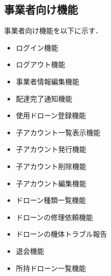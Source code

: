 \documentclass[a4paper, titlepage]{jsarticle}
\begin{document}
\subsection{事業者向け機能}
事業者向け機能を以下に示す．
\begin{itemize}[labelwidth=\linewidth]
  \setlength{\leftskip}{1em}

  \item ログイン機能  %
  \item ログアウト機能  %
  \item 事業者情報編集機能  %

  \item 配達完了通知機能  %
  \item 使用ドローン登録機能  %

  \item 子アカウント一覧表示機能 %
  \item 子アカウント発行機能 %
  \item 子アカウント削除機能 %
  \item 子アカウント編集機能 %

  \item ドローン種類一覧機能 %
  \item ドローンの修理依頼機能 %
  \item ドローンの機体トラブル報告 %
  \item 退会機能 %
  \item 所持ドローン一覧機能 %
\end{itemize}
\end{document}
